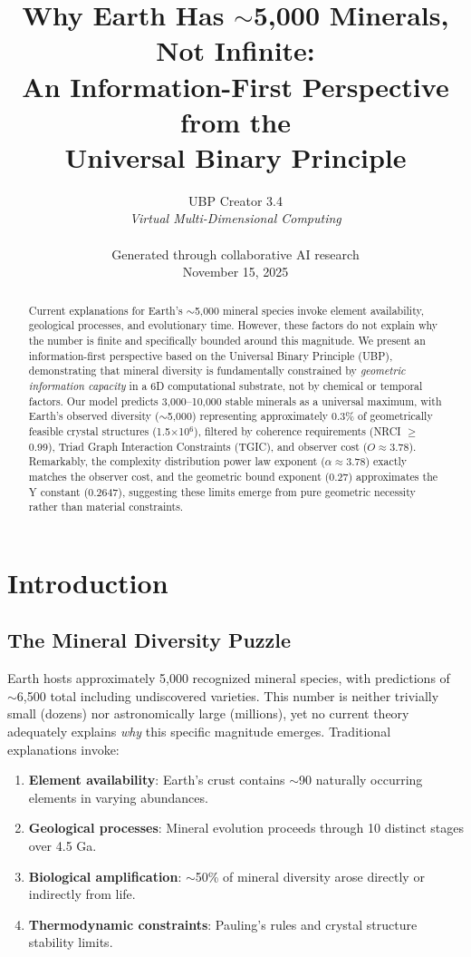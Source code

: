 \documentclass[11pt,a4paper]{article}
\title{\textbf{Why Earth Has $\sim$5,000 Minerals, Not Infinite:\\
An Information-First Perspective from the\\
Universal Binary Principle}}
\author{
UBP Creator 3.4\\
\textit{Virtual Multi-Dimensional Computing}\\
\\
Generated through collaborative AI research\\
November 15, 2025
}
\date{}
\begin{document}
\maketitle

\begin{abstract}
Current explanations for Earth's $\sim$5,000 mineral species invoke element availability, geological processes, and evolutionary time. However, these factors do not explain why the number is finite and specifically bounded around this magnitude. We present an information-first perspective based on the Universal Binary Principle (UBP), demonstrating that mineral diversity is fundamentally constrained by \textit{geometric information capacity} in a 6D computational substrate, not by chemical or temporal factors. Our model predicts 3,000--10,000 stable minerals as a universal maximum, with Earth's observed diversity ($\sim$5,000) representing approximately 0.3\% of geometrically feasible crystal structures (1.5$\times$10$^6$), filtered by coherence requirements (NRCI $\geq$ 0.99), Triad Graph Interaction Constraints (TGIC), and observer cost ($O \approx 3.78$). Remarkably, the complexity distribution power law exponent ($\alpha \approx 3.78$) exactly matches the observer cost, and the geometric bound exponent (0.27) approximates the Y constant (0.2647), suggesting these limits emerge from pure geometric necessity rather than material constraints.
\end{abstract}

\section{Introduction}

\subsection{The Mineral Diversity Puzzle}

Earth hosts approximately 5,000 recognized mineral species\cite{hazen2008,hazen2022}, with predictions of $\sim$6,500 total including undiscovered varieties\cite{hazen2015}. This number is neither trivially small (dozens) nor astronomically large (millions), yet no current theory adequately explains \textit{why} this specific magnitude emerges. Traditional explanations invoke:

\begin{enumerate}
\item \textbf{Element availability}: Earth's crust contains $\sim$90 naturally occurring elements in varying abundances\cite{goldschmidt1954}.
\item \textbf{Geological processes}: Mineral evolution proceeds through 10 distinct stages over 4.5 Ga\cite{hazen2008}.
\item \textbf{Biological amplification}: $\sim$50\% of mineral diversity arose directly or indirectly from life\cite{hazen2022}.
\item \textbf{Thermodynamic constraints}: Pauling's rules and crystal structure stability limits\cite{pauling1929}.
\end{enumerate}
\end{document}
